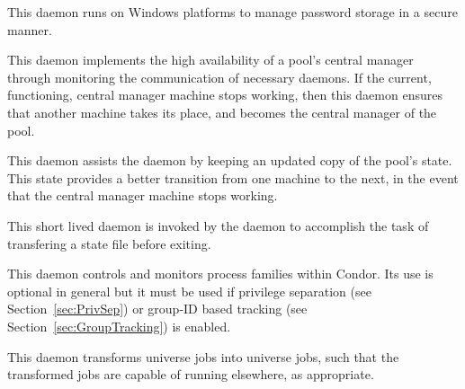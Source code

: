 \begin{description}
\item[\Condor{credd}] This daemon
runs on Windows platforms to manage password storage in a secure manner.

\item[\Condor{had}] This daemon
implements the high availability of a pool's central manager
through monitoring the communication of necessary daemons.
If the current, functioning, central manager machine
stops working, then this daemon ensures that another 
machine takes its place, and becomes the central manager of
the pool.

\item[\Condor{replication}] This daemon
assists the  daemon by keeping an updated copy of the
pool's state. This state provides a better transition
from one machine to the next, in the event 
that the central manager machine stops working.

\item[\Condor{transferer}] This short lived daemon is invoked by
the  daemon to accomplish the task of transfering
a state file before exiting.

\item[\Condor{procd}] This daemon
controls and monitors process families within Condor. Its use
is optional in general but it must be used if privilege separation
(see Section~\ref{sec:PrivSep}) or group-ID based tracking (see
Section~\ref{sec:GroupTracking}) is enabled.

\item[\Condor{job\_router}] This daemon 
transforms  universe jobs into 
universe jobs, such that the transformed jobs are capable
of running elsewhere, as appropriate.


\end{description}
